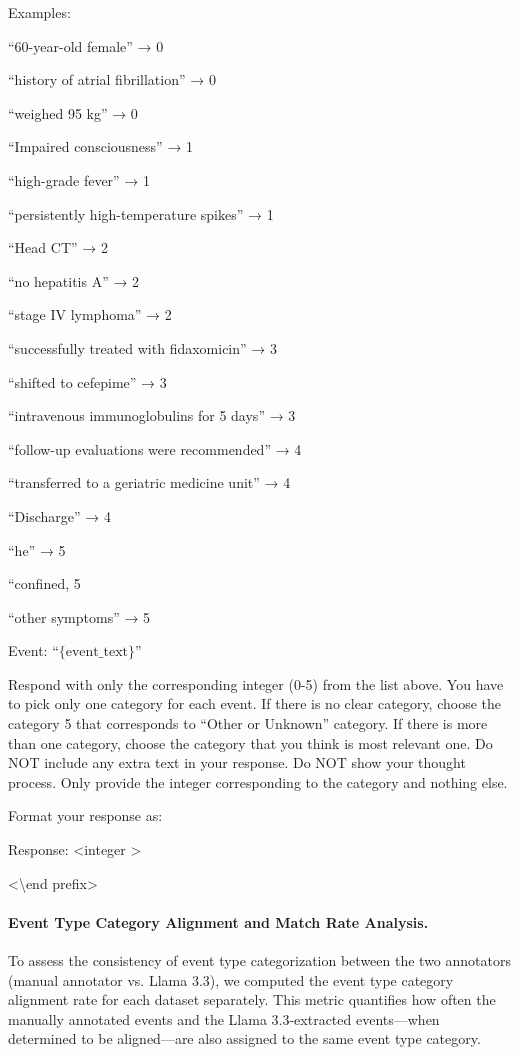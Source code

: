 \documentclass[pmlr,twocolumn,10pt]{jmlr} %
\begin{document}
\begin{tcolorbox}[
  colback=yellow!10,
  colframe=orange!80!black,
  title=Event Categorization Prompt,
  boxrule=2pt
]
Examples:

``60-year-old female'' → 0

``history of atrial fibrillation'' → 0

``weighed 95 kg'' → 0

``Impaired consciousness'' → 1

``high-grade fever'' → 1

``persistently high-temperature spikes'' → 1

``Head CT'' → 2

``no hepatitis A'' → 2

``stage IV lymphoma'' → 2

``successfully treated with fidaxomicin'' → 3

``shifted to cefepime'' → 3

``intravenous immunoglobulins for 5 days'' → 3

``follow-up evaluations were recommended'' → 4

``transferred to a geriatric medicine unit'' → 4

``Discharge'' → 4

``he'' → 5

``confined, 5

``other symptoms'' → 5
\color{black}

Event: ``$\{\text{event}\_\text{text}\}$''

Respond with only the corresponding integer (0-5) from the list above.
You have to pick only one category for each event. 
If there is no clear category, choose the category 5 that corresponds to ``Other or Unknown'' category.
If there is more than one category, choose the category that you think is most relevant one.
Do NOT include any extra text in your response. Do NOT show your thought process.
Only provide the integer corresponding to the category and nothing else.

Format your response as:

Response: \textless integer \textgreater

\textless \textbackslash end prefix\textgreater
\end{tcolorbox}

\paragraph{Event Type Category Alignment and Match Rate Analysis.}  

To assess the consistency of event type categorization between the two annotators (manual annotator vs. Llama 3.3), we computed the event type category alignment rate for each dataset separately.  
This metric quantifies how often the manually annotated events and the Llama 3.3-extracted events---when determined to be aligned---are also assigned to the same event type category.  
\end{document}
